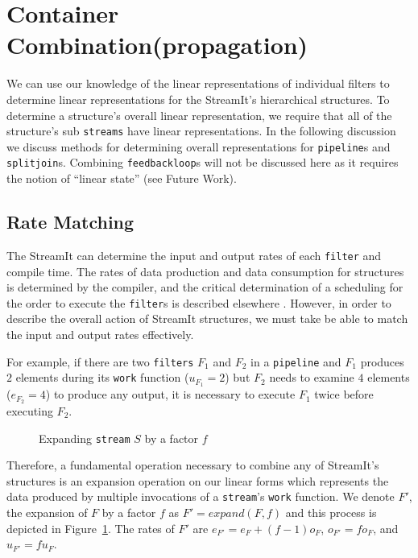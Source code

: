 \section{Container Combination(propagation)}
We can use our knowledge of the linear representations of individual filters
to determine linear representations for the StreamIt's hierarchical structures.
To determine a structure's overall linear representation, we require that all 
of the structure's sub {\tt streams} have linear representations. 
In the following discussion we discuss methods for determining overall representations for 
{\tt pipeline}s and {\tt splitjoin}s. Combining {\tt feedbackloop}s will not be discussed
here as it requires the notion of ``linear state'' (see Future Work).



\subsection{Rate Matching}
The StreamIt can determine the input and output rates of each {\tt filter} and compile
time. The rates of data production and data consumption for structures is determined 
by the compiler, and the critical determination of a scheduling for the order to execute 
the {\tt filter}s is described elsewhere \cite{karczma-thesis}. However,  
in order to describe the overall action of StreamIt structures, we must take
be able to match the input and output rates effectively. 

For example, if there are two {\tt filters} $F_1$ and $F_2$ in 
a {\tt pipeline} and $F_1$ produces $2$ elements 
during its {\tt work} function ($u_{F_1}=2$) but $F_2$ needs to examine $4$ elements 
($e_{F_2}=4$) to produce any output, it is necessary to execute $F_1$
twice before executing $F_2$. 

\begin{figure}
\center
\epsfxsize=3.0in
\caption{Expanding {\tt stream} $S$ by a factor $f$}
\label{fig:expanding-a-filter}
\vspace{-12pt}
\end{figure}

Therefore, a fundamental operation necessary to combine any of StreamIt's structures is 
an expansion operation on our linear forms which represents the data produced
by multiple invocations of a {\tt stream}'s {\tt work} function.
We denote $F'$, the expansion of $F$ by a factor $f$ as $F' = expand(F, f)$
and this process is depicted in Figure~\ref{fig:expanding-a-filter}.
The rates of $F'$ are $e_{F'}=e_F + (f-1)o_F$, $o_{F'}=fo_F$, and $u_{F'}=fu_F$.

